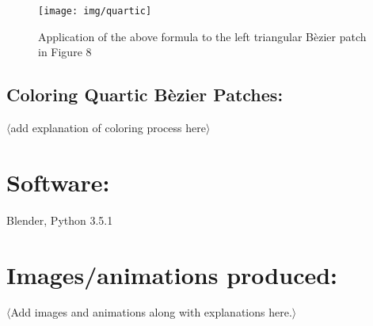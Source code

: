 \documentclass[11pt]{article}
\begin{document}
	\begin{figure}[h]
		\centering
		\captionsetup{justification=centering}
		\texttt{[image: img/quartic]}
		\caption{Application of the above formula to the left triangular B\`ezier patch in Figure 8}
	\end{figure}
	
	\pagebreak
	
	\subsection*{Coloring Quartic B\`ezier Patches:}
	$\langle$add explanation of coloring process here$\rangle$
	
	\section*{Software:}
	\vspace{-0.20in}
	Blender, Python 3.5.1
	
	
	\section*{Images/animations produced:}
	$\langle$Add images and animations along with explanations here.$\rangle$
	
\end{document}
